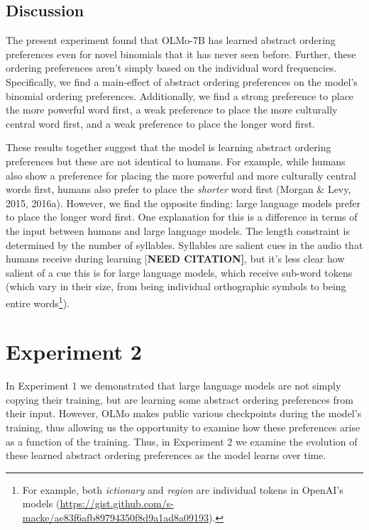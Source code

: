 \documentclass[
  10pt,
  nohyperref]{acl}
\begin{document}
\subsection{Discussion}\label{discussion}

The present experiment found that OLMo-7B has learned abstract ordering
preferences even for novel binomials that it has never seen before.
Further, these ordering preferences aren't simply based on the
individual word frequencies. Specifically, we find a main-effect of
abstract ordering preferences on the model's binomial ordering
preferences. Additionally, we find a strong preference to place the more
powerful word first, a weak preference to place the more culturally
central word first, and a weak preference to place the longer word
first.

These results together suggest that the model is learning abstract
ordering preferences but these are not identical to humans. For example,
while humans also show a preference for placing the more powerful and
more culturally central words first, humans also prefer to place the
\emph{shorter} word first (Morgan \& Levy, 2015, 2016a). However, we
find the opposite finding: large language models prefer to place the
longer word first. One explanation for this is a difference in terms of
the input between humans and large language models. The length
constraint is determined by the number of syllables. Syllables are
salient cues in the audio that humans receive during learning
{[}\textbf{NEED CITATION{]}}, but it's less clear how salient of a cue
this is for large language models, which receive sub-word tokens (which
vary in their size, from being individual orthographic symbols to being
entire words\footnote{For example, both \emph{ictionary} and
  \emph{region} are individual tokens in OpenAI's models
  (\url{https://gist.github.com/s-macke/ae83f6afb89794350f8d9a1ad8a09193}).}).

\section{Experiment 2}\label{experiment-2}

In Experiment 1 we demonstrated that large language models are not
simply copying their training, but are learning some abstract ordering
preferences from their input. However, OLMo makes public various
checkpoints during the model's training, thus allowing us the
opportunity to examine how these preferences arise as a function of the
training. Thus, in Experiment 2 we examine the evolution of these
learned abstract ordering preferences as the model learns over time.
\end{document}
